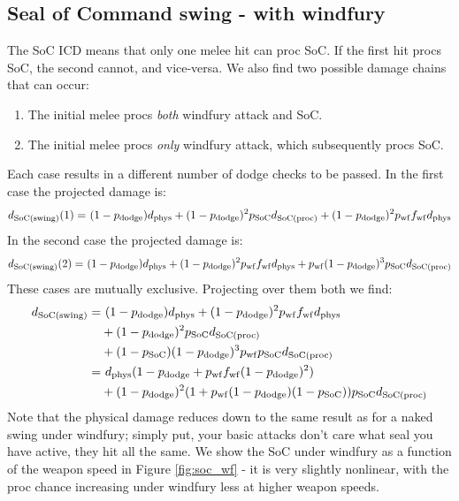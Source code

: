 \subsection{Seal of Command swing - with windfury}
The SoC ICD means that only one melee hit can proc SoC.
If the first hit procs SoC, the second cannot, and vice-versa.
We also find two possible damage chains that can occur:
\begin{enumerate}
	\item The initial melee procs \emph{both} windfury attack and SoC.
	\item The initial melee procs \emph{only} windfury attack, which subsequently procs SoC.
\end{enumerate}
Each case results in a different number of dodge checks to be passed.
In the first case the projected damage is:
\begin{equation*}
	\begin{aligned}
		d_\mathrm{SoC(swing)}  (1) =&~ (1-p_{\mathrm{dodge}} ) d_{\mathrm{phys}}  + (1-p_{\mathrm{dodge}} )^2 p_\mathrm{SoC}  d_\mathrm{SoC(proc)}  + (1-p_{\mathrm{dodge}} )^2 p_{\mathrm{wf}}  f_{\mathrm{wf}}  d_{\mathrm{phys}} \\
	\end{aligned}
\end{equation*}
In the second case the projected damage is:
\begin{equation*}
	\begin{aligned}
		d_\mathrm{SoC(swing)}  (2) =&~ (1-p_{\mathrm{dodge}} ) d_{\mathrm{phys}}  + (1-p_{\mathrm{dodge}} )^2 p_{\mathrm{wf}}  f_{\mathrm{wf}}  d_{\mathrm{phys}}  + p_{\mathrm{wf}}  (1-p_{\mathrm{dodge}} )^3 p_\mathrm{SoC}  d_\mathrm{SoC(proc)} \\
	\end{aligned}
\end{equation*}
These cases are mutually exclusive. Projecting over them both we find:
\begin{equation*}
	\begin{aligned}
		d_\mathrm{SoC(swing)}  =&~ (1-p_{\mathrm{dodge}} ) d_{\mathrm{phys}}  + (1-p_{\mathrm{dodge}} )^2 p_{\mathrm{wf}}  f_{\mathrm{wf}}  d_{\mathrm{phys}}  \\
		&+ (1-p_{\mathrm{dodge}} )^2 p_\mathrm{SoC}  d_\mathrm{SoC(proc)}  \\
		&+ (1-p_\mathrm{SoC}  )(1-p_{\mathrm{dodge}} )^3 p_{\mathrm{wf}}  p_\mathrm{SoC}   d_\mathrm{SoC(proc)}  \\
		=&~  d_{\mathrm{phys}} (1 - p_{\mathrm{dodge}}  + p_{\mathrm{wf}} f_{\mathrm{wf}} (1 -p_{\mathrm{dodge}} )^2) \\
		&+ (1-p_{\mathrm{dodge}} )^2 (1+p_{\mathrm{wf}} (1-p_{\mathrm{dodge}} )(1-p_\mathrm{SoC}  )) p_\mathrm{SoC}  d_\mathrm{SoC(proc)}  
	\end{aligned}
\end{equation*}
Note that the physical damage reduces down to the same result as for a naked swing under windfury; simply put, your basic attacks don't care what seal you have active, they hit all the same. We show the SoC under windfury as a function of the weapon speed in Figure \ref{fig:soc_wf} - it is very slightly nonlinear, with the proc chance increasing under windfury less at higher weapon speeds.


